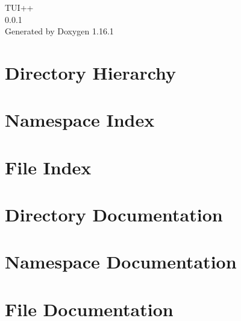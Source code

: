\documentclass[twoside]{book}
\newcommand{\+}{\discretionary{\mbox{\scriptsize$\hookleftarrow$}}{}{}}
\newcommand{\clearemptydoublepage}{%
    \newpage{\pagestyle{empty}\cleardoublepage}%
  }
\begin{document}
  \raggedbottom
    \hypersetup{pageanchor=false,
                bookmarksnumbered=true,
                pdfencoding=unicode
               }
  \begin{titlepage}
  \vspace*{7cm}
  \begin{center}%
  {\Large TUI++}\\
  [1ex]\large 0.\+0.\+1 \\
  \vspace*{1cm}
  {\large Generated by Doxygen 1.16.1}\\
  \end{center}
  \end{titlepage}
  \clearemptydoublepage
  \tableofcontents
  \clearemptydoublepage
  \hypersetup{pageanchor=true}
\chapter{Directory Hierarchy}

\chapter{Namespace Index}

\chapter{File Index}

\chapter{Directory Documentation}


\chapter{Namespace Documentation}

\chapter{File Documentation}


  \backmatter
  \newpage
  \clearemptydoublepage
  \printindex
\end{document}
